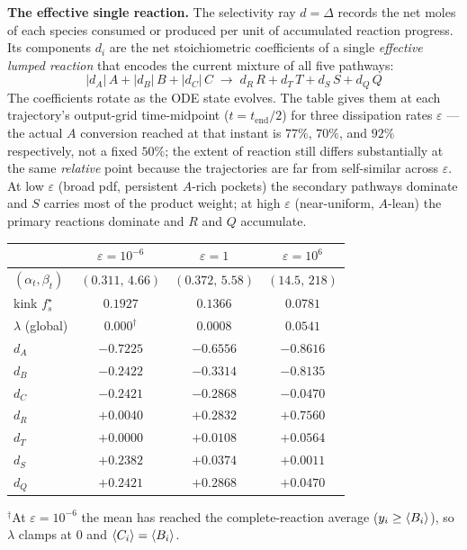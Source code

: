 \documentclass[11pt]{article}
\newcommand{\fs}{f_s^{\star}}
\DeclarePairedDelimiter{\avg}{\langle}{\rangle}
\begin{document}
\textbf{The effective single reaction.} The selectivity ray \(d=\Delta\) records the net
moles of each species consumed or produced per unit of accumulated reaction progress. Its
components \(d_i\) are the net stoichiometric coefficients of a single \emph{effective
lumped reaction} that encodes the current mixture of all five pathways:
\[
|d_A|\,A + |d_B|\,B + |d_C|\,C
\;\longrightarrow\;
d_R\,R + d_T\,T + d_S\,S + d_Q\,Q
\]
The coefficients rotate as the ODE state evolves. The table gives them at each
trajectory's output-grid time-midpoint (\(t=t_{\mathrm{end}}/2\)) for three dissipation
rates \(\varepsilon\) --- the actual \(A\) conversion reached at that instant is
\(77\%\), \(70\%\), and \(92\%\) respectively, not a fixed \(50\%\); the extent of
reaction still differs substantially at the same \emph{relative} point because the
trajectories are far from self-similar across \(\varepsilon\). At low \(\varepsilon\)
(broad pdf, persistent \(A\)-rich pockets) the secondary pathways dominate and \(S\)
carries most of the product weight; at high \(\varepsilon\) (near-uniform, \(A\)-lean)
the primary reactions dominate and \(R\) and \(Q\) accumulate.

\begin{center}\small
\begin{tabular}{l|ccc}
\toprule
 & \(\varepsilon=10^{-6}\) & \(\varepsilon=1\) & \(\varepsilon=10^{6}\)\\\midrule
\((\alpha_t,\beta_t)\) & \((0.311,\,4.66)\) & \((0.372,\,5.58)\) & \((14.5,\,218)\)\\
kink \(\fs\)           & \(0.1927\)         & \(0.1366\)         & \(0.0781\)\\
\(\lambda\) (global)   & \(0.000^{\dagger}\)& \(0.0008\)         & \(0.0541\)\\\midrule
\(d_A\) & \(-0.7225\) & \(-0.6556\) & \(-0.8616\)\\
\(d_B\) & \(-0.2422\) & \(-0.3314\) & \(-0.8135\)\\
\(d_C\) & \(-0.2421\) & \(-0.2868\) & \(-0.0470\)\\
\(d_R\) & \(+0.0040\) & \(+0.2832\) & \(+0.7560\)\\
\(d_T\) & \(+0.0000\) & \(+0.0108\) & \(+0.0564\)\\
\(d_S\) & \(+0.2382\) & \(+0.0374\) & \(+0.0011\)\\
\(d_Q\) & \(+0.2421\) & \(+0.2868\) & \(+0.0470\)\\
\bottomrule
\end{tabular}
\end{center}
{\small \(^{\dagger}\)At \(\varepsilon=10^{-6}\) the mean has reached the complete-reaction
average (\(y_i\ge\avg{B_i}\)), so \(\lambda\) clamps at \(0\) and
\(\avg{C_i}=\avg{B_i}\).}
\end{document}
